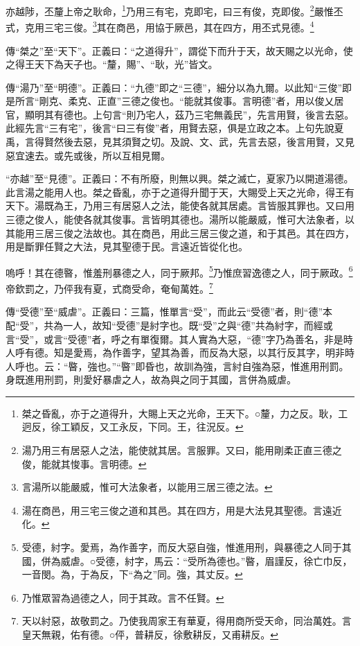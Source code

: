 亦越陟，丕釐上帝之耿命，\footnote{桀之昏亂，亦于之道得升，大賜上天之光命，王天下。○釐，力之反。耿，工迥反，徐工穎反，又工永反，下同。王，往況反。}乃用三有宅，克即宅，曰三有俊，克即俊。\footnote{湯乃用三有居惡人之法，能使就其居。言服罪。又曰，能用剛柔正直三德之俊，能就其悛事。言明德。}嚴惟丕式，克用三宅三俊。\footnote{言湯所以能嚴威，惟可大法象者，以能用三居三德之法。}其在商邑，用協于厥邑，其在四方，用丕式見德。\footnote{湯在商邑，用三宅三俊之道和其邑。其在四方，用是大法見其聖德。言遠近化。}


{\noindent\zhuan{}\fzbyks 傳“桀之”至“天下”。正義曰：“之道得升”，謂從下而升于天，故天賜之以光命，使之得王天下為天子也。“釐，賜”、“耿，光”皆文。 \par}

{\noindent\zhuan{}\fzbyks 傳“湯乃”至“明德”。正義曰：“九德”即之“三德”，細分以為九爾。以此知“三俊”即是所言“剛克、柔克、正直”三德之俊也。“能就其俊事。言明德”者，用以俊乂居官，顯明其有德也。上句言“則乃宅人，茲乃三宅無義民”，先言用賢，後言去惡。此經先言“三有宅”，後言“曰三有俊”者，用賢去惡，俱是立政之本。上句先說夏禹，言得賢然後去惡，見其須賢之切。及說、文、武，先言去惡，後言用賢，又見惡宜速去。或先或後，所以互相見爾。 \par}

{\noindent\shu{}\fzkt “亦越”至“見德”。正義曰：不有所廢，則無以興。桀之滅亡，夏家乃以開道湯德。此言湯之能用人也。桀之昏亂，亦于之道得升聞于天，大賜受上天之光命，得王有天下。湯既為王，乃用三有居惡人之法，能使各就其居處。言皆服其罪也。又曰用三德之俊人，能使各就其俊事。言皆明其德也。湯所以能嚴威，惟可大法象者，以其能用三居三俊之法故也。其在商邑，用此三居三俊之道，和于其邑。其在四方，用是斷罪任賢之大法，見其聖德于民。言遠近皆從化也。 \par}

嗚呼！其在德暋，惟羞刑暴德之人，同于厥邦。\footnote{受德，紂字。愛焉，為作善字，而反大惡自強，惟進用刑，與暴德之人同于其國，併為威虐。○受德，紂字，馬云：“受所為德也。”暋，眉謹反，徐亡巾反，一音閔。為，于為反，下“為之”同。強，其丈反。}乃惟庶習逸德之人，同于厥政。\footnote{乃惟眾習為過德之人，同于其政。言不任賢。}帝欽罰之，乃伻我有夏，式商受命，奄甸萬姓。\footnote{天以紂惡，故敬罰之。乃使我周家王有華夏，得用商所受天命，同治萬姓。言皇天無親，佑有德。○伻，普耕反，徐敷耕反，又甫耕反。}


{\noindent\zhuan{}\fzbyks 傳“受德”至“威虐”。正義曰：三篇，惟單言“受”，而此云“受德”者，則“德”本配“受”，共為一人，故知“受德”是紂字也。既“受”之與“德”共為紂字，而經或言“受”，或言“受德”者，呼之有單復爾。其人實為大惡，“德”字乃為善名，非是時人呼有德。知是愛焉，為作善字，望其為善，而反為大惡，以其行反其字，明非時人呼也。云：“暋，強也。”“暋”即昏也，故訓為強，言紂自強為惡，惟進用刑罰。身既進用刑罰，則愛好暴虐之人，故為與之同于其國，言併為威虐。 \par}

